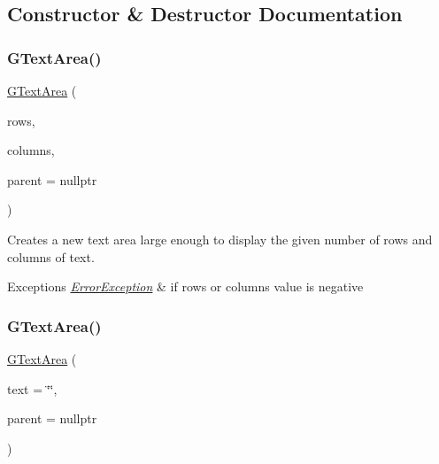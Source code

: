 \subsection{Constructor \& Destructor Documentation}
\mbox{\label{classGTextArea_aad263200ff85ead4d5e4d013c95c3107}} 
\subsubsection{\texorpdfstring{G\+Text\+Area()}{GTextArea()}\hspace{0.1cm}{\footnotesize\ttfamily [1/2]}}
{\footnotesize\ttfamily \mbox{\hyperlink{classGTextArea}{G\+Text\+Area}} (\begin{DoxyParamCaption}\item[{int}]{rows,  }\item[{int}]{columns,  }\item[{Q\+Widget $\ast$}]{parent = {\ttfamily nullptr} }\end{DoxyParamCaption})}



Creates a new text area large enough to display the given number of rows and columns of text. 


\begin{DoxyExceptions}{Exceptions}
{\em \mbox{\hyperlink{classErrorException}{Error\+Exception}}} & if rows or columns value is negative \\
\hline
\end{DoxyExceptions}
\mbox{\label{classGTextArea_a0902cdcc62cad5c1c81fc74ce38d8b13}} 
\subsubsection{\texorpdfstring{G\+Text\+Area()}{GTextArea()}\hspace{0.1cm}{\footnotesize\ttfamily [2/2]}}
{\footnotesize\ttfamily \mbox{\hyperlink{classGTextArea}{G\+Text\+Area}} (\begin{DoxyParamCaption}\item[{const std\+::string \&}]{text = {\ttfamily \char`\"{}\char`\"{}},  }\item[{Q\+Widget $\ast$}]{parent = {\ttfamily nullptr} }\end{DoxyParamCaption})}



